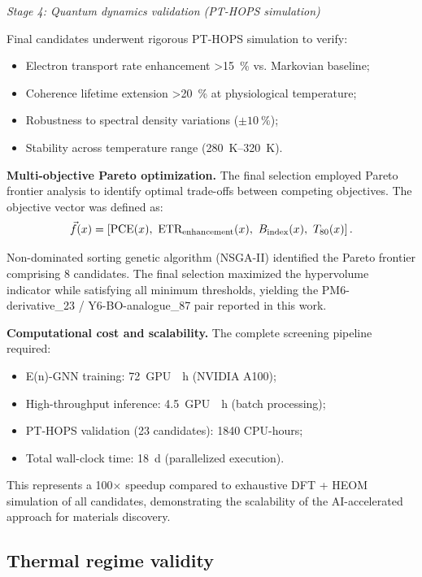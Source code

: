 \textit{Stage 4: Quantum dynamics validation (PT-HOPS simulation)}

Final candidates underwent rigorous PT-HOPS simulation to verify:
\begin{itemize}
    \item Electron transport rate enhancement \SI{>15}{\percent} vs. Markovian baseline;
    \item Coherence lifetime extension \SI{>20}{\percent} at physiological temperature;
    \item Robustness to spectral density variations ($\pm\SI{10}{\percent}$);
    \item Stability across temperature range (\SIrange{280}{320}{\kelvin}).
\end{itemize}

\textbf{Multi-objective Pareto optimization.} The final selection employed Pareto frontier analysis to identify optimal trade-offs between competing objectives. The objective vector was defined as:
\begin{equation}
\vec{f}(x) = \left[ \text{PCE}(x),~ \text{ETR}_{\rm enhancement}(x),~ B_{\rm index}(x),~ T_{80}(x) \right].
\end{equation}

Non-dominated sorting genetic algorithm (NSGA-II) identified the Pareto frontier comprising 8 candidates. The final selection maximized the hypervolume indicator while satisfying all minimum thresholds, yielding the PM6-derivative\_23 / Y6-BO-analogue\_87 pair reported in this work.

\textbf{Computational cost and scalability.} The complete screening pipeline required:
\begin{itemize}
    \item E(n)-GNN training: \SI{72}{GPU\text{-}\hour} (NVIDIA A100);
    \item High-throughput inference: \SI{4.5}{GPU\text{-}\hour} (batch processing);
    \item PT-HOPS validation (\num{23} candidates): \num{1840} CPU-hours;
    \item Total wall-clock time: \SI{18}{\day} (parallelized execution).
\end{itemize}

This represents a \num{100}$\times$ speedup compared to exhaustive DFT + HEOM simulation of all candidates, demonstrating the scalability of the AI-accelerated approach for materials discovery.

\subsection{Thermal regime validity}

